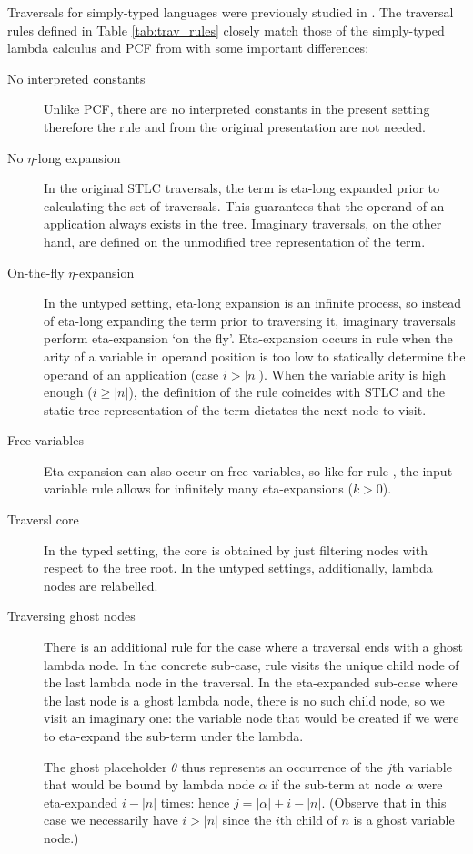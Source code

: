 \documentclass{article}
\theoremstyle{definition}
\newcommand{\ghostlmd}{{\lambda\!\!\lambda}}
\newcommand{\ghostvar}{\theta}
\begin{document}
Traversals for simply-typed languages were previously studied in \cite{BlumPhd}.
The traversal rules defined in Table \ref{tab:trav_rules} closely match those of the simply-typed lambda calculus and PCF from \cite{BlumPhd} with some important differences:
\begin{description}
  \item[No interpreted constants] Unlike PCF, there are no interpreted constants in the present setting therefore the rule  and  from the original presentation are not needed.

  \item[No $\eta$-long expansion] In the original STLC traversals, the term is eta-long expanded prior to calculating the set of traversals. This guarantees that the operand of an application always exists in the tree.
  Imaginary traversals, on the other hand, are defined on the unmodified tree representation of the term.

  \item[On-the-fly $\eta$-expansion] In the untyped setting, eta-long expansion is an infinite process, so instead of eta-long expanding the term prior to traversing it, imaginary traversals perform eta-expansion  `on the fly'. Eta-expansion occurs in rule  when the arity of a variable in operand position is too low to statically determine the operand of an application (case $i>|n|$). When the variable arity is high enough ($i\geq|n|$), the definition of the rule coincides with STLC and the static tree representation of the term dictates the next node to visit.

  \item[Free variables] Eta-expansion can also occur on free variables, so like for  rule , the input-variable rule allows for infinitely many eta-expansions ($k>0$).

  \item[Traversl core] In the typed setting, the core is  obtained by just filtering nodes with respect to the tree root. In the untyped settings, additionally, lambda nodes are relabelled.

  \item[Traversing ghost nodes] There is an additional rule \rulenamet{Lam^\ghostlmd} for the case where a traversal ends with a ghost lambda node. In the concrete sub-case, rule  visits the unique child node of the last lambda node in the traversal. In the eta-expanded sub-case where the last node is a ghost lambda node, there is no such child node, so we visit an imaginary one: the variable node that would be created if we were to eta-expand the sub-term under the lambda.

   The ghost placeholder $\ghostvar$ thus represents an occurrence of the $j$th variable that would be bound by lambda node $\alpha$ if the sub-term at node $\alpha$ were eta-expanded $i-|n|$ times: hence $j = |\alpha| + i - |n|$.
   (Observe that in this case we necessarily have $i>|n|$ since the $i$th child of $n$ is a ghost variable node.)
\end{description}
\end{document}
